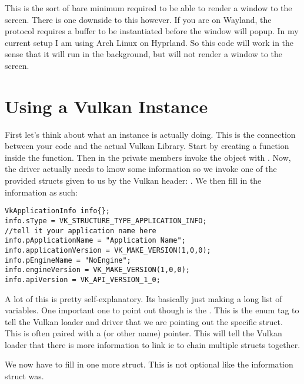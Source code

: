 \par This is the sort of bare minimum required to be able to render a window to the screen. There is one downside to this however. If you are on Wayland, the protocol requires a buffer to be instantiated before the window will popup. In my current setup I am using Arch Linux on Hyprland. So this code will work in the sense that it will run in the background, but will not render a window to the screen.

\section*{Using a Vulkan Instance}

\par First let's think about what an instance is actually doing. This is the connection between your code and the actual Vulkan Library. Start by creating a  function inside the  function. Then in the private members invoke the object with . Now, the driver actually needs to know some information so we invoke one of the provided structs given to us by the Vulkan header: . We then fill in the information as such:

\begin{center}
\begin{minipage}{0.95\linewidth}
\begin{lstlisting}
VkApplicationInfo info{};  
info.sType = VK_STRUCTURE_TYPE_APPLICATION_INFO;
//tell it your application name here
info.pApplicationName = "Application Name";
info.applicationVersion = VK_MAKE_VERSION(1,0,0);
info.pEngineName = "NoEngine";
info.engineVersion = VK_MAKE_VERSION(1,0,0);
info.apiVersion = VK_API_VERSION_1_0;
\end{lstlisting}
\end{minipage}
\end{center}

\par A lot of this is pretty self-explanatory. Its basically just making a long list of variables. One important one to point out though is the . This is the enum tag to tell the Vulkan loader and driver that we are pointing out the specific struct. This is often paired with a  (or other name) pointer. This will tell the Vulkan loader that there is more information to link ie to chain multiple structs together.

\par We now have to fill in one more struct. This is not optional like the information struct was. 

